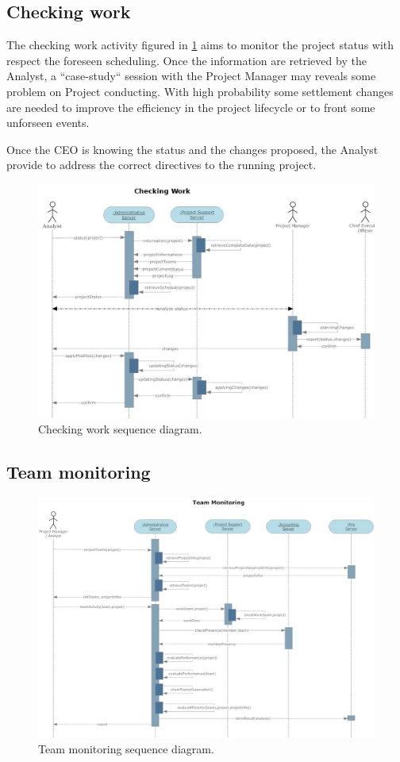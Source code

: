 \subsection{Checking work}
The checking work activity figured in \ref{3img:[sequence]checking} aims to monitor the project status with respect the foreseen scheduling. Once the information are retrieved by the Analyst, a ``case-study`` session with the Project Manager may reveals some problem on Project conducting. With high probability some settlement changes are needed to improve the efficiency in the project lifecycle or to front some unforseen events.

Once the CEO is knowing the status and the changes proposed, the Analyst provide to address the correct directives to the running project.

\begin{figure}[H]
\begin{centering}
\includegraphics[scale=0.35]{assign3/sdraw/imgs/checking.jpg}
\caption{Checking work sequence diagram.}
\label{3img:[sequence]checking}
\end{centering}
\end{figure}

\subsection{Team monitoring}
\begin{figure}[H]
\begin{centering}
\includegraphics[scale=0.40,angle=90]{assign3/sdraw/imgs/team_monitoring.jpg}
\caption{Team monitoring sequence diagram.}
\label{3img:[sequence]team_monitoring}
\end{centering}
\end{figure}